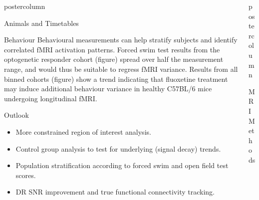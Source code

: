 \documentclass{beamer}
\newlength{\columnheight}
\begin{document}
\begin{frame}
\begin{columns}
\begin{column}{.43\textwidth}
\begin{beamercolorbox}[center]{postercolumn}
\begin{minipage}{.98\textwidth}
{\begin{myblock}{Animals and Timetables}
						\vspace{0.5em}
						\vspace{-1em}
					\end{myblock}\vfill
					\vspace{-0.3em}
					\begin{myblock}{Behaviour}
						Behavioural measurements can help stratify subjects and identify correlated fMRI activation patterns.
						Forced swim test results from the optogenetic responder cohort (figure) spread over half the measurement range, and would thus be suitable to regress fMRI variance.
						Results from all binned cohorts (figure) show a trend indicating that fluoxetine treatment may induce additional behaviour variance in healthy C57BL/6 mice undergoing longitudinal fMRI.
						\vspace{0.4em}
						\vspace{-1em}
					\end{myblock}\vfill
					\vspace{-0.3em}
					\begin{myblock}{Outlook}
						\begin{itemize}
							\item More constrained region of interest analysis.
							\item Control group analysis to test for underlying (signal decay) trends.
							\item Population stratification according to forced swim and open field test scores.
							\item DR SNR improvement and true functional connectivity tracking.
						\end{itemize}
					\end{myblock}\vfill
		}\end{minipage}\end{beamercolorbox}
	\end{column}
	\begin{column}{.57\textwidth}
		\begin{beamercolorbox}[center]{postercolumn}
			\begin{minipage}{.98\textwidth} %
				\parbox[t][\columnheight]{\textwidth}{ %
					\begin{myblock}{MRI Methods}
						\vspace{0.5em}

\end{myblock}}
\end{minipage}
\end{beamercolorbox}
\end{column}
\end{columns}
\end{frame}
\end{document}
